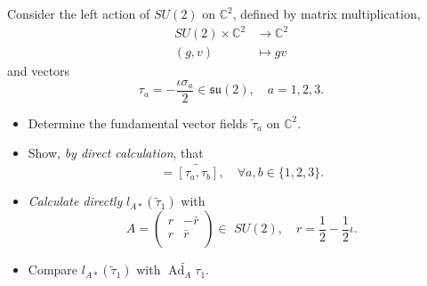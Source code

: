 \begin{exercise}
    Consider the left action of $SU(2)$ on $\mathbb{C}^2$,
    defined by matrix multiplication,
    \begin{align}
        SU(2)\times \mathbb{C}^2 &\to \mathbb{C}^2 \\
        (g,v) &\mapsto gv
    \end{align}
    and vectors
    \begin{equation*}
        \tau_a=-\frac{\iota \sigma_a}{2} \in \mathfrak{su}(2),
        \quad a=1,2,3.
    \end{equation*}
    \begin{itemize}
        \item Determine the fundamental vector fields $\tilde{\tau}_a$
        on $\mathbb{C}^2$.
        
        \item Show, \emph{by direct calculation}, that
        \begin{equation*}
            [\tilde{\tau}_a, \tilde{\tau}_b]
            =\widetilde{\left[ \tau _a,\tau _b \right] },
            \quad \forall a,b\in \{1,2,3\}.
        \end{equation*}

        \item \emph{Calculate directly} $l_{A*}(\tilde{\tau}_1)$ with
        \begin{equation*}
            A=\left( \begin{matrix}
	        r&		-\bar{r}\\
	        r&		\bar{r}\\
            \end{matrix} \right) 
            \in \,\,SU(2) ,
            \quad r=\frac{1}{2}-\frac{1}{2}\iota .
        \end{equation*}

        \item Compare $l_{A*}(\tilde{\tau}_1)$ with
        $\widetilde{\operatorname{Ad}_A \tau_1}$.
    \end{itemize}
\end{exercise}



